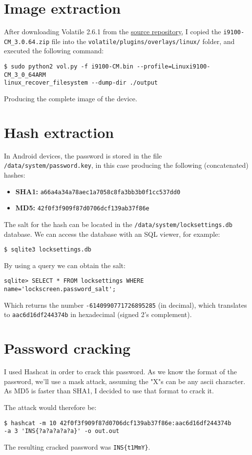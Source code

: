 \documentclass[12pt]{article}
\begin{document}


\section{Image extraction}

After downloading Volatile 2.6.1 from the \href{https://github.com/volatilityfoundation/volatility/releases/tag/2.6.1}{source repository}, I copied the \texttt{i9100-CM\_3.0.64.zip} file into the \texttt{volatile/plugins/overlays/linux/} folder, and executed the following command:

\begin{lstlisting}
$ sudo python2 vol.py -f i9100-CM.bin --profile=Linuxi9100-CM_3_0_64ARM 
linux_recover_filesystem --dump-dir ./output
\end{lstlisting}

Producing the complete image of the device.


\section{Hash extraction}

In Android devices, the password is stored in the file \texttt{/data/system/password.key}, in this case producing the following (concatenated) hashes:
\begin{itemize}
    \item \textbf{SHA1:} \texttt{a66a4a34a78aec1a7058c8fa3bb3b0f1cc537dd0}
    \item \textbf{MD5:} \texttt{42f0f3f909f87d0706dcf139ab37f86e}
\end{itemize}

The salt for the hash can be located in the \texttt{/data/system/locksettings.db} database. We can access the database with an SQL viewer, for example:
\begin{lstlisting}
$ sqlite3 locksettings.db
\end{lstlisting}

By using a query we can obtain the salt:
\begin{lstlisting}
sqlite> SELECT * FROM locksettings WHERE name='lockscreen.password_salt';
\end{lstlisting}

Which returns the number \texttt{-6140990771726895285} (in decimal), which translates to \texttt{aac6d16df244374b} in hexadecimal (signed 2's complement).

\section{Password cracking}
I used Hashcat in order to crack this password. As we know the format of the password, we'll use a mask attack, assuming the "X"s can be any ascii character. As MD5 is faster than SHA1, I decided to use that format to crack it.

The attack would therefore be:
\begin{lstlisting}
$ hashcat -m 10 42f0f3f909f87d0706dcf139ab37f86e:aac6d16df244374b 
-a 3 'INS{?a?a?a?a?a}' -o out.out
\end{lstlisting}

The resulting cracked password was \texttt{INS\{t1MmY\}}.
\end{document}
